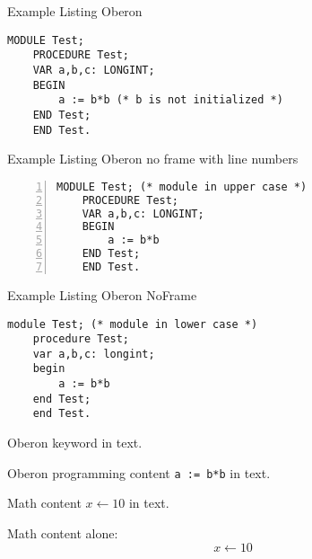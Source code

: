 \documentclass[a4paper,11pt]{article}
\newcommand{\changefont}[3]{\fontfamily{#1}\fontseries{#2}\fontshape{#3}\selectfont}
\newcommand{\kwfont}{\changefont{pcr}{b}{n}}
\newcommand{\kw}[1]{\makebox{\kwfont #1}}
\begin{document}
Example Listing Oberon
\begin{lstlisting}[language=Oberon]
    MODULE Test;
    PROCEDURE Test;
    VAR a,b,c: LONGINT;
    BEGIN
        a := b*b (* b is not initialized *)
    END Test;
    END Test.
\end{lstlisting}

Example Listing Oberon no frame with line numbers
\begin{lstlisting}[language=Oberon,frame=none,numbers=left]
    MODULE Test; (* module in upper case *)
    PROCEDURE Test;
    VAR a,b,c: LONGINT;
    BEGIN
        a := b*b
    END Test;
    END Test.
\end{lstlisting}

Example Listing Oberon NoFrame
\begin{lstlisting}[language=Oberon,frame=none]
    module Test; (* module in lower case *)
    procedure Test;
    var a,b,c: longint;
    begin
        a := b*b
    end Test;
    end Test.
\end{lstlisting}

Oberon keyword \kw{module} in text.

Oberon programming content \verb+a := b*b+ in text.

Math content $x \leftarrow 10$ in text.

Math content alone:
$$x \leftarrow 10$$
\end{document}
